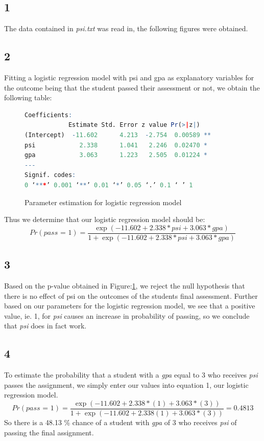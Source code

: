\documentclass{article}
\begin{document}
    \subsection*{1}
    The data contained in \textit{psi.txt} was read in, the following figures were obtained.
    \subsection*{2}
    Fitting a logistic regression model with psi and gpa as explanatory variables for the outcome being that the student passed their assessment or not, we obtain the following table:
    	\begin{figure}[H]
    	\begin{lstlisting}[language=R]
	Coefficients:
            Estimate Std. Error z value Pr(>|z|)   
(Intercept)  -11.602      4.213  -2.754  0.00589 **
psi            2.338      1.041   2.246  0.02470 * 
gpa            3.063      1.223   2.505  0.01224 * 
---
Signif. codes:  
0 ‘***’ 0.001 ‘**’ 0.01 ‘*’ 0.05 ‘.’ 0.1 ‘ ’ 1
    	\end{lstlisting}
    	\caption{Parameter estimation for logistic regression model}
    	\label{fig:log_reg}
    \end{figure}
    
    Thus we determine that our logistic regression model should be:
    \begin{equation}
   	Pr(\textit{pass = 1}) = \frac{\exp(-11.602 + 2.338*\textit{psi} + 3.063*\textit{gpa})}{1 + \exp(-11.602 + 2.338*\textit{psi} + 3.063*\textit{gpa})}
    \end{equation}
    \subsection*{3}
    Based on the p-value obtained in Figure:\ref{fig:log_reg}, we reject the null hypothesis that there is no effect of psi on the outcomes of the students final assessment. Further based on our parameters for the logistic regression model, we see that a positive value, ie. 1, for \textit{psi} causes an increase in probability of passing, so we conclude that \textit{psi} does in fact work.
    \subsection*{4}
    To estimate the probability that a student with a \textit{gpa} equal to 3 who receives \textit{psi} passes the assignment, we simply enter our values into equation 1, our logistic regression model.
    \[
    Pr(\textit{pass = 1}) = \frac{\exp(-11.602 + 2.338*(1) + 3.063*(3))}{1 + \exp(-11.602 + 2.338(1) + 3.063*(3))} = 0.4813
    \]
    So there is a 48.13 \% chance of a student with \textit{gpa} of 3 who receives \textit{psi} of passing the final assignment.
    
\end{document}
